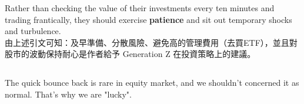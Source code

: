\documentclass[11pt]{article}
\begin{document}
Rather than checking the value of their investments every ten minutes and trading frantically, they should exercise \textbf{patience} and sit out temporary shocks and turbulence.
\\ 由上述引文可知：及早準備、分散風險、避免高的管理費用（去買ETF），並且對股市的波動保持耐心是作者給予 Generation Z 在投資策略上的建議。

\subsection{}
The quick bounce back is rare in equity market, and we shouldn't concerned it as normal. That's why we are "lucky".
\end{document}
